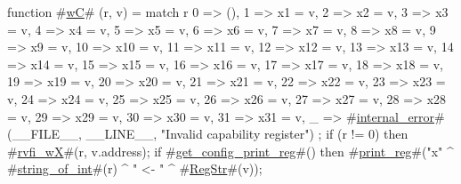 function #\hyperref[sailRISCVzwC]{wC}# (r, v) = {
  match r {
    0  => (),
    1  => x1 = v,
    2  => x2 = v,
    3  => x3 = v,
    4  => x4 = v,
    5  => x5 = v,
    6  => x6 = v,
    7  => x7 = v,
    8  => x8 = v,
    9  => x9 = v,
    10 => x10 = v,
    11 => x11 = v,
    12 => x12 = v,
    13 => x13 = v,
    14 => x14 = v,
    15 => x15 = v,
    16 => x16 = v,
    17 => x17 = v,
    18 => x18 = v,
    19 => x19 = v,
    20 => x20 = v,
    21 => x21 = v,
    22 => x22 = v,
    23 => x23 = v,
    24 => x24 = v,
    25 => x25 = v,
    26 => x26 = v,
    27 => x27 = v,
    28 => x28 = v,
    29 => x29 = v,
    30 => x30 = v,
    31 => x31 = v,
    _  => #\hyperref[sailRISCVzinternalzyerror]{internal\_error}#(__FILE__, __LINE__, "Invalid capability register")
  };
  if (r != 0) then {
     #\hyperref[sailRISCVzrvfizywX]{rvfi\_wX}#(r, v.address);
     if #\hyperref[sailRISCVzgetzyconfigzyprintzyreg]{get\_config\_print\_reg}#() then
       #\hyperref[sailRISCVzprintzyreg]{print\_reg}#("x" ^ #\hyperref[sailRISCVzstringzyofzyint]{string\_of\_int}#(r) ^ " <- " ^ #\hyperref[sailRISCVzRegStr]{RegStr}#(v));
  }
}
